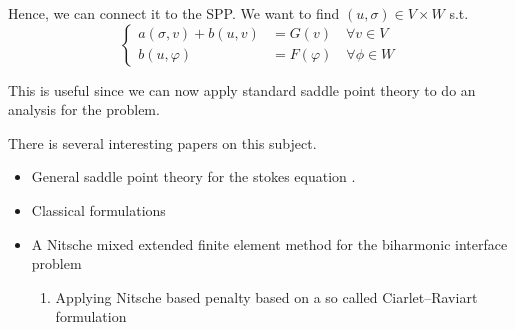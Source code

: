 Hence, we can connect it to the SPP. We want to find $( u,\sigma ) \in V \times W$ s.t.  \[
    \begin{cases}
       a( \sigma ,v) + b ( u, v )  & = G( v)   \quad  \forall v \in V \\
       b( u, \varphi  )  & = F( \varphi )     \quad \forall \phi \in W
    \end{cases}
\]

This is useful since we can now apply standard saddle point theory to do an analysis for the problem.

There is several interesting papers on this subject.
\begin{itemize}
    \item General saddle point theory for the stokes equation \cite{john2016finite, knabner2003numerical}.
    \item Classical formulations \cite{babuvska1980analysis}
    \item  A Nitsche mixed extended finite element method for the biharmonic interface problem \cite{cai2023nitsche}
        \begin{enumerate}[label=\arabic*)]
            \item Applying Nitsche based penalty based on a so called Ciarlet–Raviart formulation
        \end{enumerate}
\end{itemize}






